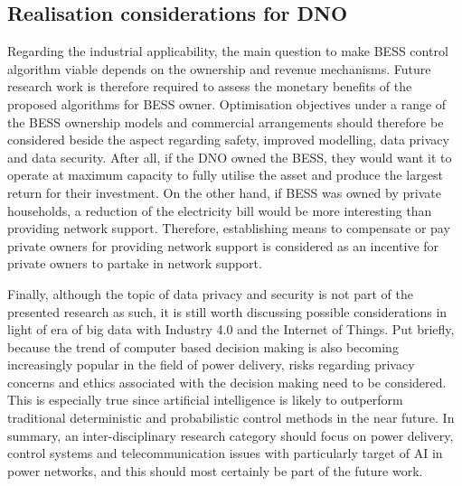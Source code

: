 \subsection{Realisation considerations for DNO}

Regarding the industrial applicability, the main question to make BESS control algorithm viable depends on the ownership and revenue mechanisms.
Future research work is therefore required to assess the monetary benefits of the proposed algorithms for BESS owner.
Optimisation objectives under a range of the BESS ownership models and commercial arrangements should therefore be considered beside the  aspect regarding safety, improved modelling, data privacy and data security.
After all, if the DNO owned the BESS, they would want it to operate at maximum capacity to fully utilise the asset and produce the largest return for their investment.
On the other hand, if BESS was owned by private households, a reduction of the electricity bill would be more interesting than providing network support.
Therefore, establishing means to compensate or pay private owners for providing network support is considered as an incentive for private owners to partake in network support.

Finally, although the topic of data privacy and security is not part of the presented research as such, it is still worth discussing possible considerations in light of era of big data with Industry 4.0 and the Internet of Things.
Put briefly, because the trend of computer based decision making is also becoming increasingly popular in the field of power delivery, risks regarding privacy concerns and ethics associated with the decision making need to be considered.
This is especially true since artificial intelligence is likely to outperform traditional deterministic and probabilistic control methods in the near future.
In summary, an inter-disciplinary research category should focus on power delivery, control systems and telecommunication issues with particularly target of AI in power networks, and this should most certainly be part of the future work.
